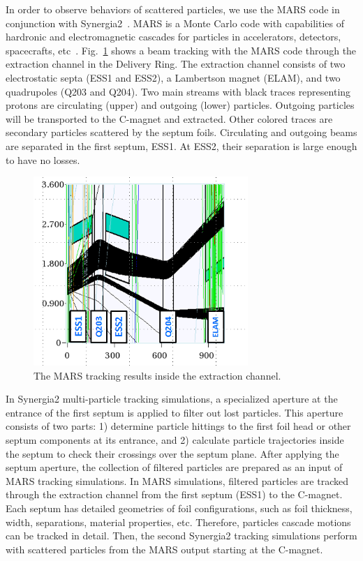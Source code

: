 \documentclass[aps,prstab,onecolumn,preprint,endfloats,11pt]{revtex4-1}
\begin{document}
In order to observe behaviors of scattered particles, we use the MARS code in conjunction with Synergia2~\cite{mars1}. MARS is a Monte Carlo code with capabilities of hardronic and electromagnetic cascades for particles in accelerators, detectors, spacecrafts, etc~\cite{mars2}. Fig.~\ref{fig:beamloss1} shows a beam tracking with the MARS code through the extraction channel in the Delivery Ring. The extraction channel consists of two electrostatic septa (ESS1 and ESS2), a Lambertson magnet (ELAM), and two quadrupoles (Q203 and Q204). Two main streams with black traces representing protons are circulating (upper) and outgoing (lower) particles. Outgoing particles will be transported to the C-magnet and extracted. Other colored traces are secondary particles scattered by the septum foils. Circulating and outgoing beams are separated in the first septum, ESS1. At ESS2, their separation is large enough to have no losses. 

\begin{figure}[!tbp]
  \includegraphics[width=3.2in]{img/fig_beamloss1}
  \caption{\label{fig:beamloss1}The MARS tracking results inside the extraction channel.}
\end{figure}

In Synergia2 multi-particle tracking simulations, a specialized aperture at the entrance of the first septum is applied to filter out lost particles. This aperture consists of two parts: 1) determine particle hittings to the first foil head or other septum components at its entrance, and 2) calculate particle trajectories inside the septum to check their crossings over the septum plane. After applying the septum aperture, the collection of filtered particles are prepared as an input of MARS tracking simulations. In MARS simulations, filtered particles are tracked through the extraction channel from the first septum (ESS1) to the C-magnet. Each septum has detailed geometries of foil configurations, such as foil thickness, width, separations, material properties, etc. Therefore, particles cascade motions can be tracked in detail. Then, the second Synergia2 tracking simulations perform with scattered particles from the MARS output starting at the C-magnet. 
\end{document}
